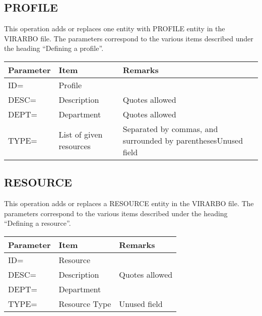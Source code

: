\documentclass[letterpaper,10pt,english]{sphinxmanual}
\begin{document}
\ignorespaces 

\subsection{PROFILE}
\label{\detokenize{Installation_Guide:profile}}\label{\detokenize{Installation_Guide:index-168}}
This operation adds or replaces one entity with PROFILE entity in the VIRARBO file. The parameters correspond to the various items described under the heading “Defining a profile”.


\begin{savenotes}\sphinxattablestart
\centering
\begin{tabulary}{\linewidth}[t]{|T|T|T|}
\hline
\sphinxstyletheadfamily 
Parameter
&\sphinxstyletheadfamily 
Item
&\sphinxstyletheadfamily 
Remarks
\\
\hline
ID=
&
Profile
&\\
\hline
DESC=
&
Description
&
Quotes allowed
\\
\hline
DEPT=
&
Department
&
Quotes allowed
\\
\hline
TYPE=
&
List of given resources
&
Separated by commas, and surrounded by parenthesesUnused field
\\
\hline
\end{tabulary}
\par
\sphinxattableend\end{savenotes}

\ignorespaces 

\subsection{RESOURCE}
\label{\detokenize{Installation_Guide:resource}}\label{\detokenize{Installation_Guide:index-169}}
This operation adds or replaces a RESOURCE entity in the VIRARBO file. The parameters correspond to the various items described under the heading “Defining a resource”.


\begin{savenotes}\sphinxattablestart
\centering
\begin{tabulary}{\linewidth}[t]{|T|T|T|}
\hline
\sphinxstyletheadfamily 
Parameter
&\sphinxstyletheadfamily 
Item
&\sphinxstyletheadfamily 
Remarks
\\
\hline
ID=
&
Resource
&\\
\hline
DESC=
&
Description
&
Quotes allowed
\\
\hline
DEPT=
&
Department
&\\
\hline
TYPE=
&
Resource Type
&
Unused field
\\
\hline
\end{tabulary}
\par
\sphinxattableend\end{savenotes}
\end{document}
